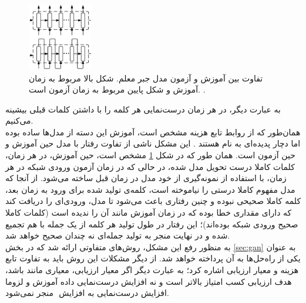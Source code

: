 \begin{figure}[H]
	\centering
	\includegraphics[width=0.25\textwidth]{images/teach-prof.png}
	\caption{
		تفاوت بین آموزش و آزمون مد‌ل جبر معلم. شکل بالا مربوط به زمان آموزش و شکل پایین مربوط به زمان آزمون است. \cite{prof-force}.}
	\label{fig:expbias}
\end{figure}

به عبارت دیگر، در هر زمان درست‌نمایی هر کلمه را با داشتن کلمات قبلی بیشینه می‌کنیم. \\
همان‌طور که از روابط تابع هزینه مشخص است، آموزش این دسته از مدل‌ها ساده بوده اما دچار پدیده‌ای به نام  هستند \cite{ prof-force, ssampling}. این مشکل ناشی از تفاوت رفتار با مدل حین آموزش و حین آزمون است. همان طور که در شکل \ref{fig:expbias} مشخص است، حین آموزش، در هر زمان، کلمات کاملا درست تحویل مدل شده، در حالی که در زمان آزمون ورودی شبکه در هر زمان، با استفاده از نمونه‌گیری از خود مدل در زمان قبل ساخته می‌شود. از آنجا که مدل مفهوم کاملا درستی را نیاموخته است، کلمه‌ی تولید شده برای ورود به زمان بعد، کلمه کاملا صحیحی نبوده و چنین رفتاری باعث می‌شود تا مدل، ورودی‌ای را دریافت کند که دارای مقداری خطا بوده که در زمان آموزش مانند آن را ندیده است (کلمات کاملا صحیح ورودی شبکه بوده‌اند)؛ این رفتار در طول تولید هر کلمه از یک جمله با هم تجمیع شده و در نهایت منجر به تولید جمله‌ای نه چندان صحیح خواهد شد.\\
به منظور رفع این مشکل، روش‌های متفاوتی ارائه شد \cite{prof-force, ssampling} که در بخش \ref{sec:gan} به عنوان یکی از راه‌حل‌ها به آن پرداخته خواهد شد.
از دیگر مشکلات این روش باید به تفاوت تابع هزینه و معیار ارزیابی اشاره کرد؛ به عبارت دیگر اگر معیار ارزیابی، معیاری مانند  باشد، هدف ارزیابی کسب امتیاز بالاتر  است و نه افزایش درست‌نمایی داده آموزش و لزوما افزایش درست‌نمایی به افزایش ‌ منجر نمی‌شود.
